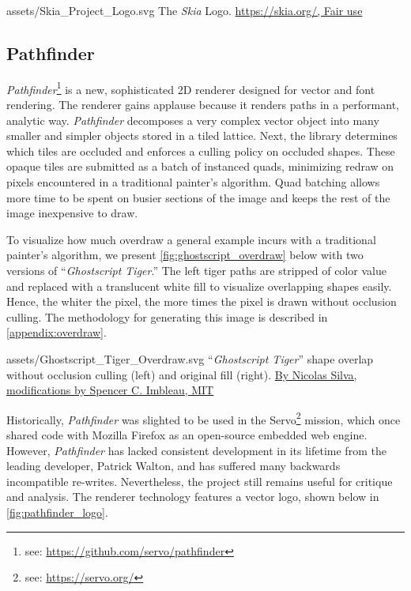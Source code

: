 \smallsvg
{assets/Skia_Project_Logo.svg}
{The \textit{Skia} Logo.\label{fig:skia_logo}}
{\href{https://skia.org}{https://skia.org/, Fair use}}

\subsection{Pathfinder}\label{sec:Pathfinder}

\textit{Pathfinder}\footnote{see: \href{https://github.com/servo/pathfinder}{https://github.com/servo/pathfinder}} is a new, sophisticated 2D renderer designed for vector and font rendering. The renderer gains applause because it renders paths in a performant, analytic way. \textit{Pathfinder} decomposes a very complex vector object into many smaller and simpler objects stored in a tiled lattice. Next, the library determines which tiles are occluded and enforces a culling policy on occluded shapes. These opaque tiles are submitted as a batch of instanced quads, minimizing redraw on pixels encountered in a traditional painter's algorithm. Quad batching allows more time to be spent on busier sections of the image and keeps the rest of the image inexpensive to draw\cite{Pathfinder_Features}.\medskip

To visualize how much overdraw a general example incurs with a traditional painter's algorithm, we present \cref{fig:ghostscript_overdraw} below with two versions of ``\textit{Ghostscript Tiger}.'' The left tiger paths are stripped of color value and replaced with a translucent white fill to visualize overlapping shapes easily. Hence, the whiter the pixel, the more times the pixel is drawn without occlusion culling. The methodology for generating this image is described in \cref{appendix:overdraw}.

\widesvg
{assets/Ghostscript_Tiger_Overdraw.svg}
{``\textit{Ghostscript Tiger}'' shape overlap without occlusion culling (left) and original fill (right).\label{fig:ghostscript_overdraw}}
{\href{https://nical.github.io/posts/a-look-at-pathfinder.html}{By Nicolas Silva, modifications by Spencer C. Imbleau, MIT}}
\medskip

Historically, \textit{Pathfinder} was slighted to be used in the Servo\footnote{see: \href{https://servo.org/}{https://servo.org/}} mission, which once shared code with Mozilla Firefox as an open-source embedded web engine. However, \textit{Pathfinder} has lacked consistent development in its lifetime from the leading developer, Patrick Walton, and has suffered many backwards incompatible re-writes. Nevertheless, the project still remains useful for critique and analysis\cite{Silva19}. The renderer technology features a vector logo, shown below in \cref{fig:pathfinder_logo}.

